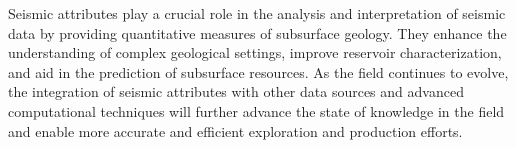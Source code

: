 Seismic attributes play a crucial role in the analysis and interpretation of seismic data by providing quantitative measures of subsurface geology.
They enhance the understanding of complex geological settings, improve reservoir characterization, and aid in the prediction of subsurface resources.
As the field continues to evolve, the integration of seismic attributes with other data sources and advanced computational techniques will further advance the state of knowledge in the field and enable more accurate and efficient exploration and production efforts.

